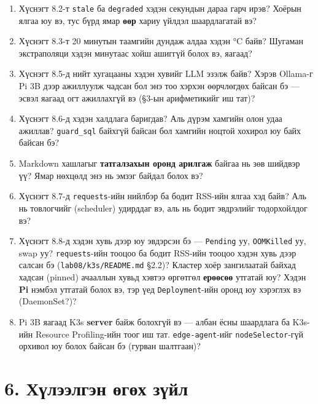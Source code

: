 \begin{enumerate}
\def\labelenumi{\arabic{enumi}.}
\item
  Хүснэгт 8.2-т \texttt{stale} ба \texttt{degraded} хэдэн секундын дараа гарч ирэв? Хоёрын ялгаа юу вэ, тус бүрд ямар \textbf{өөр} хариу үйлдэл шаардлагатай вэ?
\item
  Хүснэгт 8.3-т 20 минутын таамгийн дундаж алдаа хэдэн °C байв? Шугаман экстраполяци хэдэн минутаас хойш ашиггүй болох вэ, яагаад?
\item
  Хүснэгт 8.5-д нийт хугацааны хэдэн хувийг LLM эзэлж байв? Хэрэв Ollama-г Pi 3B дээр ажиллуулж чадсан бол энэ тоо хэрхэн өөрчлөгдөх байсан бэ --- эсвэл яагаад огт ажиллахгүй вэ (§3-ын арифметикийг иш тат)?
\item
  Хүснэгт 8.6-д хэдэн халдлага баригдав? Аль дүрэм хамгийн олон удаа ажиллав? \texttt{guard\_sql} байхгүй байсан бол хамгийн ноцтой хохирол юу байх байсан бэ?
\item
  Markdown хашлагыг \textbf{татгалзахын оронд арилгаж} байгаа нь зөв шийдвэр үү? Ямар нөхцөлд энэ нь эмзэг байдал болох вэ?
\item
  Хүснэгт 8.7-д \texttt{requests}-ийн нийлбэр ба бодит RSS-ийн ялгаа хэд байв? Аль нь товлогчийг (scheduler) удирддаг вэ, аль нь бодит эвдрэлийг тодорхойлдог вэ?
\item
  Хүснэгт 8.8-д хэдэн хувь дээр юу эвдэрсэн бэ --- \texttt{Pending} уу, \texttt{OOMKilled} уу, swap уу? \texttt{requests}-ийн тооцоо ба бодит RSS-ийн тооцоо хэдэн хувь дээр салсан бэ (\texttt{lab08/\allowbreak{}k3s/\allowbreak{}README.\allowbreak{}md} §2.2)? Кластер хоёр зангилаатай байхад хадсан (pinned) ачааллын хувьд хэвтээ өргөтгөл \textbf{ерөөсөө} утгатай юу? Хэдэн \textbf{Pi} нэмбэл утгатай болох вэ, тэр үед \texttt{Deployment}-ийн оронд юу хэрэглэх вэ (DaemonSet?)?
\item
  Pi 3B яагаад K3s \textbf{server} байж болохгүй вэ --- албан ёсны шаардлага ба K3s-ийн Resource Profiling-ийн тоог иш тат. \texttt{edge-agent}-ийг \texttt{nodeSelector}-гүй орхивол юу болох байсан бэ (гурван шалтгаан)?
\end{enumerate}

\hypertarget{ux445ux4afux43bux44dux44dux43bux433ux44dux43d-ux4e9ux433ux4e9ux445-ux437ux4afux439ux43b}{%
\section{6. Хүлээлгэн өгөх зүйл}\label{ux445ux4afux43bux44dux44dux43bux433ux44dux43d-ux4e9ux433ux4e9ux445-ux437ux4afux439ux43b}}

